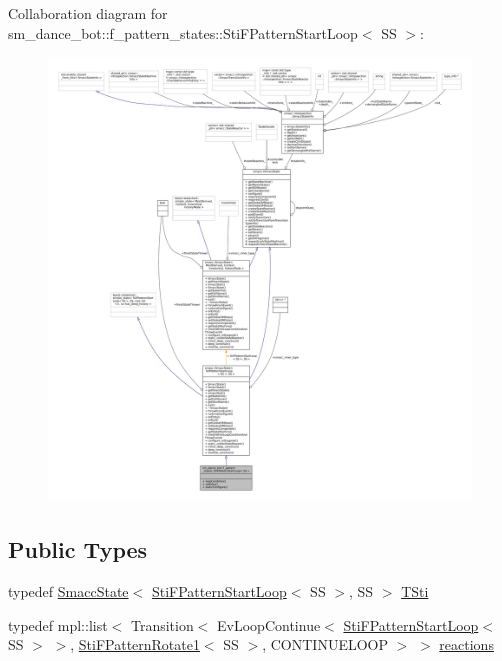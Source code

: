 Collaboration diagram for sm\+\_\+dance\+\_\+bot\+:\+:f\+\_\+pattern\+\_\+states\+:\+:Sti\+F\+Pattern\+Start\+Loop$<$ SS $>$\+:
\nopagebreak
\begin{figure}[H]
\begin{center}
\leavevmode
\includegraphics[width=350pt]{structsm__dance__bot_1_1f__pattern__states_1_1StiFPatternStartLoop__coll__graph}
\end{center}
\end{figure}
\subsection*{Public Types}
\begin{DoxyCompactItemize}
\item 
typedef \hyperlink{classSmaccState}{Smacc\+State}$<$ \hyperlink{structsm__dance__bot_1_1f__pattern__states_1_1StiFPatternStartLoop}{Sti\+F\+Pattern\+Start\+Loop}$<$ SS $>$, SS $>$ \hyperlink{structsm__dance__bot_1_1f__pattern__states_1_1StiFPatternStartLoop_a18f1bcdd4f45d9230c9b23b6153ae9e2}{T\+Sti}
\item 
typedef mpl\+::list$<$ Transition$<$ Ev\+Loop\+Continue$<$ \hyperlink{structsm__dance__bot_1_1f__pattern__states_1_1StiFPatternStartLoop}{Sti\+F\+Pattern\+Start\+Loop}$<$ SS $>$ $>$, \hyperlink{structsm__dance__bot_1_1f__pattern__states_1_1StiFPatternRotate1}{Sti\+F\+Pattern\+Rotate1}$<$ SS $>$, C\+O\+N\+T\+I\+N\+U\+E\+L\+O\+OP $>$ $>$ \hyperlink{structsm__dance__bot_1_1f__pattern__states_1_1StiFPatternStartLoop_ab410fb656e621c3ce2ee7bb0bb11eae2}{reactions}
\end{DoxyCompactItemize}
